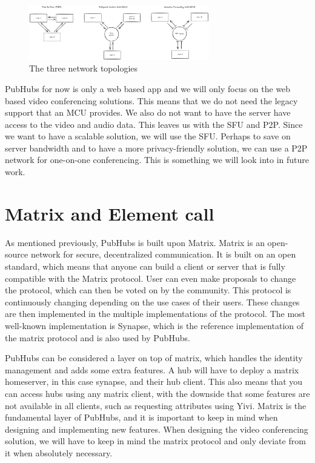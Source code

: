 \documentclass{report}
\begin{document}
\begin{figure}[!hbt]
\centering
\includegraphics[width=0.7\textwidth]{img/thesisDPD}
\caption{The three network topologies}
\label{fig:three-options-video-conferencing}
\end{figure}

PubHubs for now is only a web based app and we will only focus on the web based video conferencing solutions. This means
that we do not need the legacy support that an MCU provides. We also do not want to have the server have access to the
video and audio data. This leaves us with the SFU and P2P. Since we want to have a scalable solution, we will use the SFU.
Perhaps to save on server bandwidth and to have a more privacy-friendly solution, we can use a P2P network for one-on-one
conferencing. This is something we will look into in future work.

\section{Matrix and Element call}
\label{sec:matrix}
As mentioned previously, PubHubs is built upon Matrix. Matrix is an open-source network for secure, decentralized
communication. It is built on an open standard, which means that anyone can build a client or server that is fully
compatible with the Matrix protocol. User can even make proposals to change the protocol, which can then be voted on
by the community. This protocol is continuously changing depending on the use cases of their users. These changes
are then implemented in the multiple implementations of the protocol. The most well-known implementation is Synapse,
which is the reference implementation of the matrix protocol and is also used by PubHubs.

PubHubs can be considered a layer on top of matrix, which handles the identity management and adds some extra features.
A hub will have to deploy a matrix homeserver, in this case synapse, and their hub client. This also means that you can
access hubs using any matrix client, with the downside that some features are not available in all clients, such as
requesting attributes using Yivi. Matrix is the fundamental layer of PubHubs, and it is important to keep in mind
when designing and implementing new features. When designing the video conferencing solution, we will have to keep
in mind the matrix protocol and only deviate from it when absolutely necessary.
\end{document}

